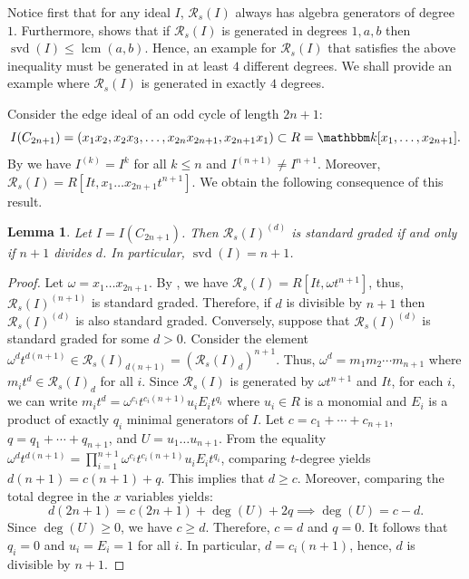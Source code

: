\documentclass[12pt]{amsart}
\numberwithin{equation}{section}
\newtheorem{lemma}[theorem]{Lemma}
\theoremstyle{definition}
\DeclareMathOperator{\lcm}{lcm}
\DeclareMathOperator{\svd}{svd}
\newcommand{\kk}{{\mathbbm k}}
\def\R{{\mathcal R}}
\def\R{{\mathcal R}}
\begin{document}
Notice first that for any ideal $I$, $\R_s(I)$ always has algebra generators of degree $1$. Furthermore, \cite[Proposition 5.5]{Thaithesis} shows that if $\R_s(I)$ is generated in degrees $1,a,b$ then $\svd(I)\le \lcm(a,b)$. Hence, an example for $\R_s(I)$ that satisfies the above inequality must be generated in at least $4$ different degrees. We shall provide an example where $\R_s(I)$ is generated in exactly $4$ degrees. \par

\vspace{0.5em}

Consider the edge ideal of an odd cycle of length $2n+1$:
$$I(C_{2n+1}) = (x_1x_2,x_2x_3,\ldots ,x_{2n}x_{2n+1},x_{2n+1}x_1) \subset R=\kk[x_1,\ldots,x_{2n+1}].$$ 
By \cite[Theorem 3.4]{GHOS20} we have $I^{(k)}=I^k$ for all $k \le n$ and $I^{(n+1)} \not = I^{n+1}$. 
Moreover, $\mathcal{R}_s(I)=R[It,x_1\ldots x_{2n+1}t^{n+1}]$. 
We obtain the following consequence of this result.

\begin{lemma}
    \label{lem.UniCyclic}
    Let $I=I(C_{2n+1})$. Then $\mathcal{R}_s(I)^{(d)}$ is standard graded if and only if $n+1$ divides $d$. In particular, $\svd(I)=n+1$.
\end{lemma}

\begin{proof}
    Let $\omega =x_1\ldots x_{2n+1}$. By \cite[Theorem 3.4]{GHOS20}, we have $\mathcal{R}_s(I)=R[It, \omega t^{n+1}]$, thus, $\mathcal{R}_s(I)^{(n+1)}$ is standard graded. 
    Therefore, if $d$ is divisible by $n+1$ then $\mathcal{R}_s(I)^{(d)}$ is also standard graded. 
    Conversely, suppose that $\mathcal{R}_s(I)^{(d)}$ is standard graded for some $d>0$. Consider the element $\omega^dt^{d(n+1)} \in \mathcal{R}_s(I)_{d(n+1)}=\left( \mathcal{R}_s(I)_{d}\right)^{n+1}$. 
    Thus, $\omega^d = m_1 m_2 \cdots m_{n+1}$ where $m_it^d \in \mathcal{R}_s(I)_{d}$ for all $i$. 
    Since $\mathcal{R}_s(I)$ is generated by $\omega t^{n+1}$ and $It$, for each $i$, we can write $m_it^d = \omega^{c_i}t^{c_i(n+1)} u_iE_it^{q_i}$ where $u_i \in R$ is a monomial and $E_i$ is a product of exactly $q_i$ minimal generators of $I$. 
    Let $c=c_1+\cdots + c_{n+1}$, $q=q_1+\cdots + q_{n+1}$, and $U=u_1\ldots u_{n+1}$. 
    From the equality $\omega^dt^{d(n+1)} = \prod_{i=1}^{n+1} \omega^{c_i}t^{c_i(n+1)} u_iE_it^{q_i}$, comparing $t$-degree yields $d(n+1)=c(n+1)+q$. This implies that $d\ge c$.
    Moreover, comparing the total degree in the $x$ variables yields: 
    \[
    d(2n+1)=c(2n+1)+\deg(U)+2q \implies \deg(U)=c-d.
    \]
    Since $\deg(U) \ge 0$, we have $c\ge d$. 
    Therefore, $c=d$ and $q=0$. 
    It follows that $q_i=0$ and $u_i=E_i=1$ for all $i$. 
    In particular, $d=c_i(n+1)$, hence, $d$ is divisible by $n+1$.
\end{proof}
\end{document}
